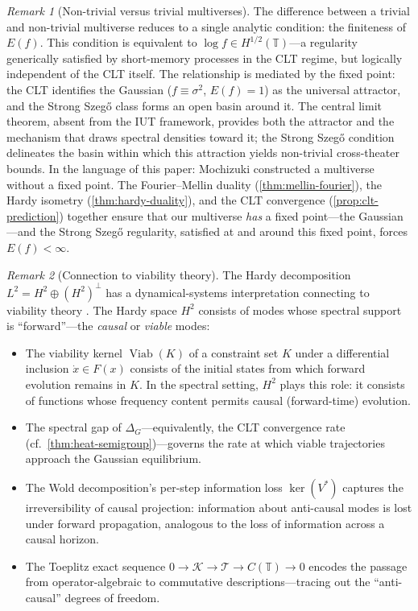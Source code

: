 \documentclass[12pt]{amsart}
\theoremstyle{definition}
\theoremstyle{remark}
\newtheorem*{remark}{Remark}
\newcommand{\bT}{\mathbb{T}}
\newcommand{\Htwo}{H^2}
\newcommand{\cK}{\mathcal{K}}
\newcommand{\cT}{\mathcal{T}}
\begin{document}
\begin{remark}[Non-trivial versus trivial multiverses]
The difference between a trivial and non-trivial multiverse reduces to a single analytic condition: the finiteness of $E(f)$. This condition is equivalent to $\log f \in H^{1/2}(\bT)$---a regularity generically satisfied by short-memory processes in the CLT regime, but logically independent of the CLT itself. The relationship is mediated by the fixed point: the CLT identifies the Gaussian ($f \equiv \sigma^2$, $E(f) = 1$) as the universal attractor, and the Strong Szeg\H{o} class forms an open basin around it. The central limit theorem, absent from the IUT framework, provides both the attractor and the mechanism that draws spectral densities toward it; the Strong Szeg\H{o} condition delineates the basin within which this attraction yields non-trivial cross-theater bounds. In the language of this paper: Mochizuki constructed a multiverse without a fixed point. The Fourier--Mellin duality (\cref{thm:mellin-fourier}), the Hardy isometry (\cref{thm:hardy-duality}), and the CLT convergence (\cref{prop:clt-prediction}) together ensure that our multiverse \emph{has} a fixed point---the Gaussian---and the Strong Szeg\H{o} regularity, satisfied at and around this fixed point, forces $E(f) < \infty$.
\end{remark}

\begin{remark}[Connection to viability theory]
The Hardy decomposition $L^2 = \Htwo \oplus (\Htwo)^\perp$ has a dynamical-systems interpretation connecting to viability theory \cite{Aubin}. The Hardy space $\Htwo$ consists of modes whose spectral support is ``forward''---the \emph{causal} or \emph{viable} modes:
\begin{itemize}
\item The viability kernel $\operatorname{Viab}(K)$ of a constraint set $K$ under a differential inclusion $\dot{x} \in F(x)$ \cite[Chapter~4]{Aubin} consists of the initial states from which forward evolution remains in $K$. In the spectral setting, $\Htwo$ plays this role: it consists of functions whose frequency content permits causal (forward-time) evolution.
\item The spectral gap of $\Delta_G$---equivalently, the CLT convergence rate (cf.\ \cref{thm:heat-semigroup})---governs the rate at which viable trajectories approach the Gaussian equilibrium.
\item The Wold decomposition's per-step information loss $\ker(V^*)$ captures the irreversibility of causal projection: information about anti-causal modes is lost under forward propagation, analogous to the loss of information across a causal horizon.
\item The Toeplitz exact sequence $0 \to \cK \to \cT \to C(\bT) \to 0$ encodes the passage from operator-algebraic to commutative descriptions---tracing out the ``anti-causal'' degrees of freedom.
\end{itemize}
\end{remark}
\end{document}
